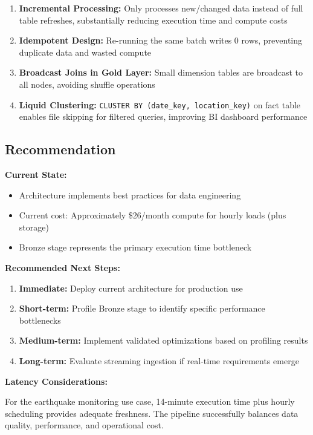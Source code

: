 \documentclass[11pt,a4paper]{article}
\begin{document}
\begin{enumerate}
    \item \textbf{Incremental Processing:} Only processes new/changed data instead of full table refreshes, substantially reducing execution time and compute costs
    
    \item \textbf{Idempotent Design:} Re-running the same batch writes 0 rows, preventing duplicate data and wasted compute
    
    \item \textbf{Broadcast Joins in Gold Layer:} Small dimension tables are broadcast to all nodes, avoiding shuffle operations
    
    \item \textbf{Liquid Clustering:} \texttt{CLUSTER BY (date\_key, location\_key)} on fact table enables file skipping for filtered queries, improving BI dashboard performance
\end{enumerate}

\subsection{Recommendation}

\textbf{Current State:}
\begin{itemize}
    \item Architecture implements best practices for data engineering
    \item Current cost: Approximately \$26/month compute for hourly loads (plus storage)
    \item Bronze stage represents the primary execution time bottleneck
\end{itemize}

\textbf{Recommended Next Steps:}
\begin{enumerate}
    \item \textbf{Immediate:} Deploy current architecture for production use
    \item \textbf{Short-term:} Profile Bronze stage to identify specific performance bottlenecks
    \item \textbf{Medium-term:} Implement validated optimizations based on profiling results
    \item \textbf{Long-term:} Evaluate streaming ingestion if real-time requirements emerge
\end{enumerate}

\textbf{Latency Considerations:}

For the earthquake monitoring use case, 14-minute execution time plus hourly scheduling provides adequate freshness. The pipeline successfully balances data quality, performance, and operational cost.
\end{document}
